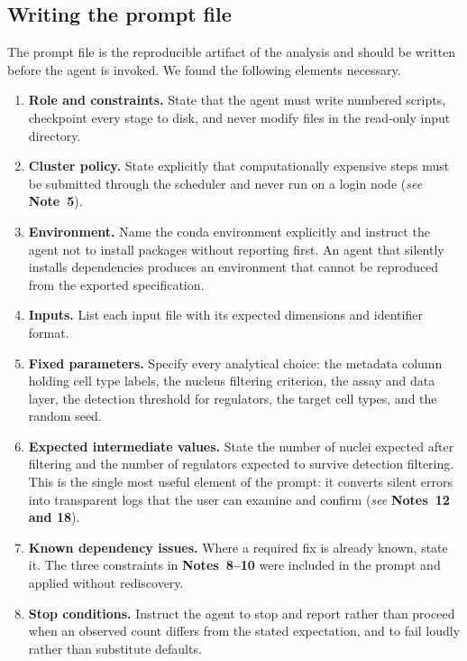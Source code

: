 \documentclass[11pt,a4paper]{article}
\newcommand{\seenote}[1]{(\textit{see} \textbf{Note~#1})}
\newcommand{\seenotes}[1]{(\textit{see} \textbf{Notes~#1})}
\begin{document}
\subsection{Writing the prompt file}

The prompt file is the reproducible artifact of the analysis and should be written before the agent is invoked. We found the following elements necessary.

\begin{enumerate}[leftmargin=*]
\item \textbf{Role and constraints.} State that the agent must write numbered scripts, checkpoint every stage to disk, and never modify files in the read-only input directory.

\item \textbf{Cluster policy.} State explicitly that computationally expensive steps must be submitted through the scheduler and never run on a login node \seenote{5}.

\item \textbf{Environment.} Name the conda environment explicitly and instruct the agent not to install packages without reporting first. An agent that silently installs dependencies produces an environment that cannot be reproduced from the exported specification.

\item \textbf{Inputs.} List each input file with its expected dimensions and identifier format.

\item \textbf{Fixed parameters.} Specify every analytical choice: the metadata column holding cell type labels, the nucleus filtering criterion, the assay and data layer, the detection threshold for regulators, the target cell types, and the random seed.

\item \textbf{Expected intermediate values.} State the number of nuclei expected after filtering and the number of regulators expected to survive detection filtering. This is the single most useful element of the prompt: it converts silent errors into transparent logs that the user can examine and confirm \seenotes{12 and 18}.

\item \textbf{Known dependency issues.} Where a required fix is already known, state it. The three constraints in \textbf{Notes~8--10} were included in the prompt and applied without rediscovery.

\item \textbf{Stop conditions.} Instruct the agent to stop and report rather than proceed when an observed count differs from the stated expectation, and to fail loudly rather than substitute defaults.
\end{enumerate}
\end{document}
